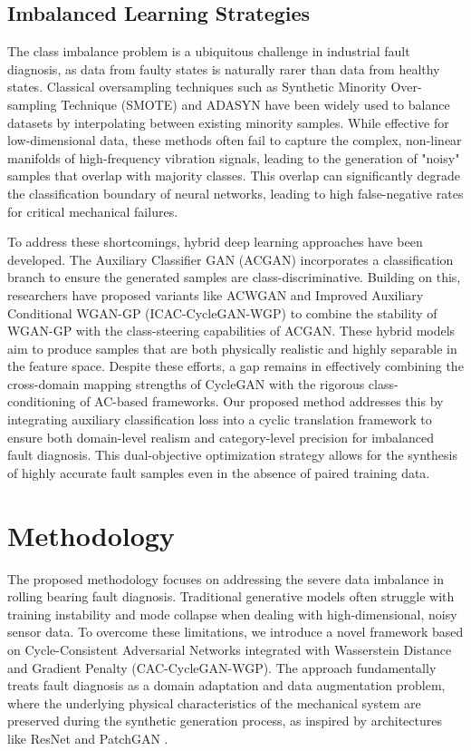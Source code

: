 \documentclass[conference,twocolumn]{IEEEtran}
\begin{document}
\subsection{Imbalanced Learning Strategies}
The class imbalance problem is a ubiquitous challenge in industrial fault diagnosis, as data from faulty states is naturally rarer than data from healthy states. Classical oversampling techniques such as Synthetic Minority Over-sampling Technique (SMOTE) \cite{6} and ADASYN \cite{35} have been widely used to balance datasets by interpolating between existing minority samples. While effective for low-dimensional data, these methods often fail to capture the complex, non-linear manifolds of high-frequency vibration signals, leading to the generation of "noisy" samples that overlap with majority classes. This overlap can significantly degrade the classification boundary of neural networks, leading to high false-negative rates for critical mechanical failures.

To address these shortcomings, hybrid deep learning approaches have been developed. The Auxiliary Classifier GAN (ACGAN) \cite{5} incorporates a classification branch to ensure the generated samples are class-discriminative. Building on this, researchers have proposed variants like ACWGAN \cite{35} and Improved Auxiliary Conditional WGAN-GP (ICAC-CycleGAN-WGP) \cite{26} to combine the stability of WGAN-GP with the class-steering capabilities of ACGAN. These hybrid models aim to produce samples that are both physically realistic and highly separable in the feature space. Despite these efforts, a gap remains in effectively combining the cross-domain mapping strengths of CycleGAN with the rigorous class-conditioning of AC-based frameworks. Our proposed method addresses this by integrating auxiliary classification loss into a cyclic translation framework to ensure both domain-level realism and category-level precision for imbalanced fault diagnosis. This dual-objective optimization strategy allows for the synthesis of highly accurate fault samples even in the absence of paired training data.


\section{Methodology}
\label{sec:methodology}

The proposed methodology focuses on addressing the severe data imbalance in rolling bearing fault diagnosis. Traditional generative models often struggle with training instability and mode collapse when dealing with high-dimensional, noisy sensor data. To overcome these limitations, we introduce a novel framework based on Cycle-Consistent Adversarial Networks integrated with Wasserstein Distance and Gradient Penalty (CAC-CycleGAN-WGP). The approach fundamentally treats fault diagnosis as a domain adaptation and data augmentation problem, where the underlying physical characteristics of the mechanical system are preserved during the synthetic generation process, as inspired by architectures like ResNet \cite{He2016} and PatchGAN \cite{Isola2017}.
\end{document}

